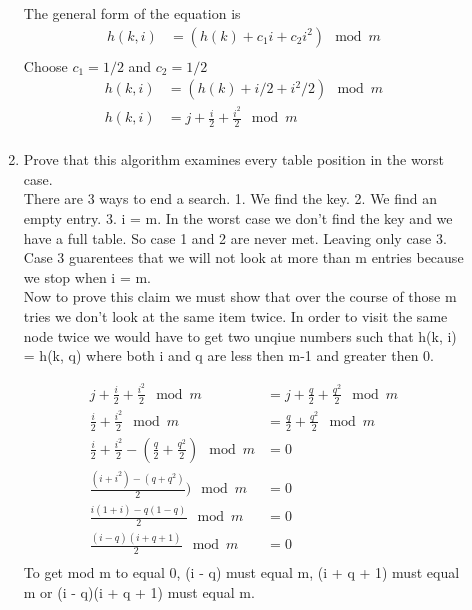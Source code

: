 \documentclass{article}
\begin{document}
\begin{description}
\begin{enumerate}
      The general form of the equation is \\
      \begin{align*}
      h(k,i) &= (h(k) + c_1 i + c_2i^2) \mod m\\
      \end{align*}
      Choose $c_1 = 1/2$ and $c_2 = 1/2$ \\
      \begin{align*}
      h(k,i) &= (h(k) + i/2 + i^2/2) \mod m \\
      h(k,i) &= j + \frac{i}{2} + \frac{i^2}{2}  \mod m \\
      \end{align*}
      \item Prove that this algorithm examines every table position in
        the worst case.\\

        There are 3 ways to end a search. 1. We find the key. 2. We find an empty entry. 3. i = m.
        In the worst case we don't find the key and we have a full table. So case 1 and 2 are never met. 
        Leaving only case 3. Case 3 guarentees that we will not look at more than m entries because we stop
        when i = m. \\

        Now to prove this claim we must show that over the course of those m tries we don't look at the same item twice.
        In order to visit the same node twice we would have to get two unqiue numbers such that h(k, i) = h(k, q) where both i and q are less then m-1 and greater then 0.

         \begin{align*}
      j + \frac{i}{2} + \frac{i^2}{2}  \mod m &= j + \frac{q}{2} + \frac{q^2}{2}  \mod m \\
      \frac{i}{2} + \frac{i^2}{2}  \mod m &= \frac{q}{2} + \frac{q^2}{2}  \mod m \\
      \frac{i}{2} + \frac{i^2}{2} - (\frac{q}{2} + \frac{q^2}{2}) \mod m &=  0 \\
      \frac{(i + i^2) - (q + q^2)}{2}) \mod m &=  0 \\
      \frac{i(1 + i) - q(1 - q)}{2} \mod m &=  0 \\
      \frac{(i- q) (i + q + 1)}{2} \mod m &=  0 \\
      \end{align*}
      To get mod m to equal 0, (i - q) must equal m, (i + q + 1) must equal m or (i - q)(i + q + 1) must equal m. \\


\end{enumerate}
\end{description}
\end{document}
